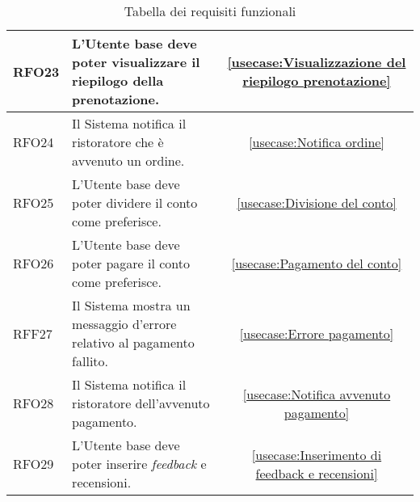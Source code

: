 \begin{table}[H]
\begin{tabularx}{\textwidth}{l|X|c}
		\hline
		RFO23       & L'Utente base deve poter visualizzare il riepilogo della prenotazione.                                    & \autoref{usecase:Visualizzazione del riepilogo prenotazione} \\
		\hline
		RFO24       & Il Sistema notifica il ristoratore che è avvenuto un ordine.                                              & \autoref{usecase:Notifica ordine}                            \\
		\hline
		RFO25       & L'Utente base deve poter dividere il conto come preferisce.                                               & \autoref{usecase:Divisione del conto}                        \\
		\hline
		RFO26       & L'Utente base deve poter pagare il conto come preferisce.                                                 & \autoref{usecase:Pagamento del conto}                        \\
		\hline
		RFF27       & Il Sistema mostra un messaggio d'errore relativo al pagamento fallito.                                    & \autoref{usecase:Errore pagamento}                           \\
		\hline
		RFO28       & Il Sistema notifica il ristoratore dell'avvenuto pagamento.                                               & \autoref{usecase:Notifica avvenuto pagamento}                \\
		\hline
		RFO29       & L'Utente base deve poter inserire \textit{feedback} e recensioni.                                         & \autoref{usecase:Inserimento di feedback e recensioni}       \\
		\hline
	\end{tabularx}
	\caption{Tabella dei requisiti funzionali}
\end{table}


